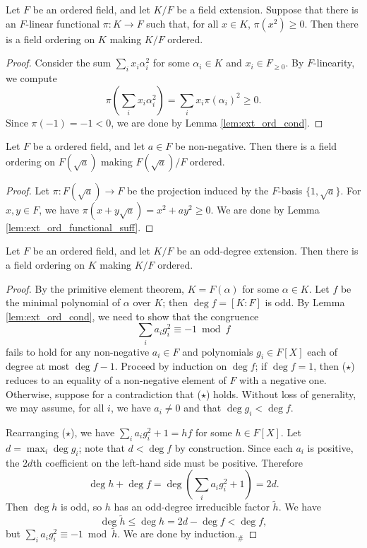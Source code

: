 \begin{lemma}
  \label{lem:ext_ord_functional_suff}
  \leanok
  Let $F$ be an ordered field, and let $K/F$ be a field extension. Suppose that there is an $F$-linear functional $\pi:K\to F$ such that, for all $x\in K$, $\pi(x^2)\geq0$. Then there is a field ordering on $K$ making $K/F$ ordered.
\end{lemma}
\begin{proof}
  \leanok
  Consider the sum $\sum_i x_i\alpha_i^2$ for some $\alpha_i\in K$ and $x_i\in F_{\geq0}$. By $F$-linearity, we compute
  \[\pi(\sum_i x_i\alpha_i^2)=\sum_i x_i\pi(\alpha_i)^2\geq0.\]
  Since $\pi(-1)=-1<0$, we are done by Lemma \ref{lem:ext_ord_cond}.
\end{proof}

\begin{corollary}
  \label{cor:ext_ord_to_adj_sqrt}
  Let $F$ be a ordered field, and let $a\in F$ be non-negative. Then there is a field ordering on $F(\sqrt{a})$ making $F(\sqrt{a})/F$ ordered.
\end{corollary}
\begin{proof}
  Let $\pi:F(\sqrt{a})\to F$ be the projection induced by the $F$-basis $\{1,\sqrt{a}\}$. For $x,y\in F$, we have $\pi(x+y\sqrt{a})=x^2+ay^2\geq0$. We are done by Lemma \ref{lem:ext_ord_functional_suff}.
\end{proof}

\begin{lemma}
  \label{lem:ext_ord_odd_deg}
  \leanok
  Let $F$ be an ordered field, and let $K/F$ be an odd-degree extension. Then there is a field ordering on $K$ making $K/F$ ordered.
\end{lemma}
\begin{proof}
  \leanok
  By the primitive element theorem, $K=F(\alpha)$ for some $\alpha\in K$. Let $f$ be the minimal polynomial of $\alpha$ over $K$; then $\deg f=[K:F]$ is odd. By Lemma \ref{lem:ext_ord_cond}, we need to show that the congruence
  \[\sum_ia_ig_i^2\equiv-1\bmod f\tag{$\star$}\]
  fails to hold for any non-negative $a_i\in F$ and polynomials $g_i\in F[X]$ each of degree at most $\deg f-1$. Proceed by induction on $\deg f$; if $\deg f=1$, then ($\star$) reduces to an equality of a non-negative element of $F$ with a negative one. Otherwise, suppose for a contradiction that ($\star$) holds. Without loss of generality, we may assume, for all $i$, we have $a_i\neq0$ and that $\deg g_i<\deg f$.
  
  Rearranging ($\star$), we have $\sum_ia_ig_i^2+1=hf$ for some $h\in F[X]$. Let $d=\max_i\deg g_i$; note that $d<\deg f$ by construction. Since each $a_i$ is positive, the $2d$th coefficient on the left-hand side must be positive. Therefore
  \[\deg h+\deg f=\deg(\sum_ia_ig_i^2+1)=2d.\]
  Then $\deg h$ is odd, so $h$ has an odd-degree irreducible factor $\tilde h$. We have
  \[\deg\tilde h\leq\deg h=2d-\deg f<\deg f,\]
  but $\sum_ia_ig_i^2\equiv-1\bmod\tilde h$. We are done by induction.$_\#$
\end{proof}

